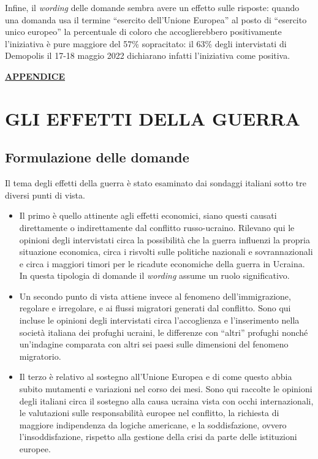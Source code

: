 \documentclass[
  openany]{book}
\begin{document}
Infine, il \emph{wording} delle domande sembra avere un effetto sulle risposte: quando una domanda usa il termine ``esercito dell'Unione Europea'' al posto di ``esercito unico europeo'' la percentuale di coloro che accoglierebbero positivamente l'iniziativa è pure maggiore del 57\% sopracitato: il 63\% degli intervistati di Demopolis il 17-18 maggio 2022 dichiarano infatti l'iniziativa come positiva.

\href{https://github.com/LucianaFazio/Ucrania/blob/main/PDF_Appendice/V.\%20Cosa\%20dobbiamo\%20possiamo\%20fare\%20noi\%20v.5.pdf}{\textbf{APPENDICE}}

\hypertarget{gli-effetti-della-guerra}{%
\chapter{GLI EFFETTI DELLA GUERRA}\label{gli-effetti-della-guerra}}

\hypertarget{formulazione-delle-domande-4}{%
\section{Formulazione delle domande}\label{formulazione-delle-domande-4}}

Il tema degli effetti della guerra è stato esaminato dai sondaggi italiani sotto tre diversi punti di vista.

\begin{itemize}
\item
  Il primo è quello attinente agli effetti economici, siano questi causati direttamente o indirettamente dal conflitto russo-ucraino. Rilevano qui le opinioni degli intervistati circa la possibilità che la guerra influenzi la propria situazione economica, circa i risvolti sulle politiche nazionali e sovrannazionali e circa i maggiori timori per le ricadute economiche della guerra in Ucraina. In questa tipologia di domande il \emph{wording} assume un ruolo significativo.
\item
  Un secondo punto di vista attiene invece al fenomeno dell'immigrazione, regolare e irregolare, e ai flussi migratori generati dal conflitto. Sono qui incluse le opinioni degli intervistati circa l'accoglienza e l'inserimento nella società italiana dei profughi ucraini, le differenze con ``altri'' profughi nonché un'indagine comparata con altri sei paesi sulle dimensioni del fenomeno migratorio.
\item
  Il terzo è relativo al sostegno all'Unione Europea e di come questo abbia subito mutamenti e variazioni nel corso dei mesi. Sono qui raccolte le opinioni degli italiani circa il sostegno alla causa ucraina vista con occhi internazionali, le valutazioni sulle responsabilità europee nel conflitto, la richiesta di maggiore indipendenza da logiche americane, e la soddisfazione, ovvero l'insoddisfazione, rispetto alla gestione della crisi da parte delle istituzioni europee.
\end{itemize}
\end{document}
